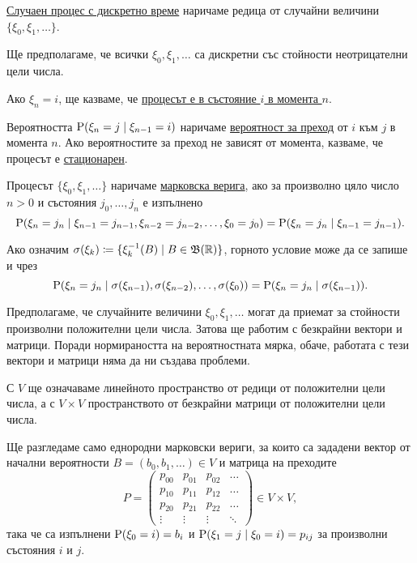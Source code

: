 \documentclass[numbers=endperiod, DIV=15, bibliography=totocnumbered]{scrartcl}
\begin{document}
\begin{definition}
  \uline{Случаен процес с дискретно време} наричаме редица от случайни величини $\{ \xi_0, \xi_1, \ldots \}$.

  Ще предполагаме, че всички $\xi_0, \xi_1, \ldots$ са дискретни със стойности неотрицателни цели числа.

  Ако $\xi_n = i$, ще казваме, че \uline{процесът е в състояние $i$ в момента $n$}.

  Вероятността $\operatorname{P}(\xi_n = j \mid \xi_{n-1} = i)$ наричаме \uline{вероятност за преход} от $i$ към $j$ в момента $n$. Ако вероятностите за преход не зависят от момента, казваме, че процесът е \uline{стационарен}.

  Процесът $\{ \xi_0, \xi_1, \ldots \}$ наричаме \uline{марковска верига}, ако за произволно цяло число $n > 0$ и състояния $j_0, \ldots, j_n$ е изпълнено
  \begin{displaymath}
    \operatorname{P}(\xi_n = j_n \mid \xi_{n-1} = j_{n-1}, \xi_{n-2} = j_{n-2}, \ldots, \xi_0 = j_0) = \operatorname{P}(\xi_n = j_n \mid \xi_{n-1} = j_{n-1}).
  \end{displaymath}

  Ако означим $\sigma(\xi_k) \coloneqq \{ \xi_k^{-1}(B) \mid B \in \mathfrak{B}(\mathbb{R}) \}$, горното условие може да се запише и чрез
  \begin{displaymath}
    \operatorname{P}(\xi_n = j_n \mid \sigma(\xi_{n-1}), \sigma(\xi_{n-2}), \ldots, \sigma(\xi_0)) = \operatorname{P}(\xi_n = j_n \mid \sigma(\xi_{n-1})).
  \end{displaymath}
\end{definition}

\begin{note}
  Предполагаме, че случайните величини $\xi_0, \xi_1, \ldots$ могат да приемат за стойности произволни положителни цели числа. Затова ще работим с безкрайни вектори и матрици. Поради нормираността на вероятностната мярка, обаче, работата с тези вектори и матрици няма да ни създава проблеми.
\end{note}

С $V$ ще означаваме линейното пространство от редици от положителни цели числа, а с $V \times V$ пространството от безкрайни матрици от положителни цели числа.

Ще разгледаме само еднородни марковски вериги, за които са зададени вектор от начални вероятности $B = (b_0, b_1, \ldots) \in V$ и матрица на преходите
\begin{displaymath}
  P = \begin{pmatrix}
    p_{00} & p_{01} & p_{02} & \ldots \\
    p_{10} & p_{11} & p_{12} & \ldots \\
    p_{20} & p_{21} & p_{22} & \ldots \\
    \vdots & \vdots & \vdots & \ddots
  \end{pmatrix} \in V \times V,
\end{displaymath}
така че са изпълнени $\operatorname{P}(\xi_0 = i) = b_i$ и $\operatorname{P}(\xi_1 = j \mid \xi_0 = i) = p_{ij}$ за произволни състояния $i$ и $j$.
\end{document}
